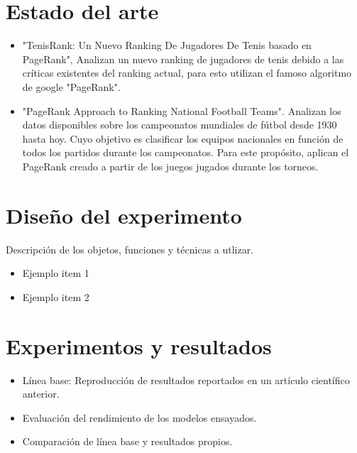 \documentclass[twocolumn]{article}
\begin{document}
\section{Estado del arte}
\begin{itemize}
	\item
	"TenisRank: Un Nuevo Ranking De Jugadores De Tenis
basado en PageRank", Analizan un nuevo ranking de jugadores de tenis debido a las críticas existentes del ranking actual, para esto utilizan el famoso algoritmo de google "PageRank".
	\item
	"PageRank Approach to Ranking National Football Teams". Analizan los datos disponibles sobre los campeonatos mundiales de fútbol desde 1930 hasta hoy. Cuyo objetivo es clasificar los equipos nacionales en función de todos los partidos durante los campeonatos. Para este propósito, aplican el PageRank creado a partir de los juegos jugados durante los torneos. 
	\end{itemize}	
\section{Diseño del experimento}
Descripción de los objetos, funciones y técnicas a utlizar.

\begin{itemize}
	\item
	Ejemplo item 1
	\item
	Ejemplo item 2
	\end{itemize}	

\section{Experimentos y resultados}

\begin{itemize}
	\item
	Línea base: Reproducción de resultados reportados en un artículo científico
anterior.
	\item
	Evaluación del rendimiento de los modelos ensayados.
    \item
    Comparación de línea base y resultados propios.
	\end{itemize}	
\end{document}

